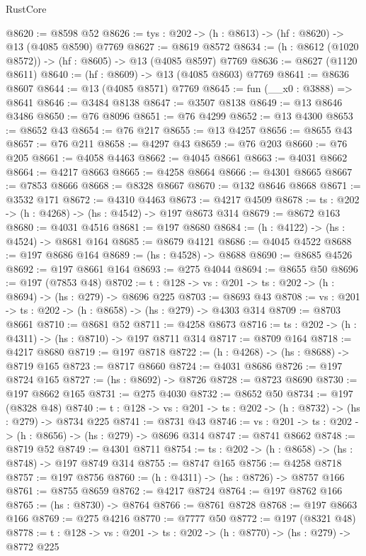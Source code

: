 \begin{lexlean}{RustCore}
\begin{coremodule}
@8620 := @8598 @52
@8626 := {tys : @202} -> (h : @8613) -> (hf : @8620) -> @13 (@4085 @8590) @7769
@8627 := @8619 @8572
@8634 := (h : @8612 (@1020 @8572)) -> (hf : @8605) -> @13 (@4085 @8597) @7769
@8636 := @8627 (@1120 @8611)
@8640 := (hf : @8609) -> @13 (@4085 @8603) @7769
@8641 := @8636 @8607
@8644 := @13 (@4085 @8571) @7769
@8645 := fun (__x0 : @3888) => @8641
@8646 := @3484 @8138
@8647 := @3507 @8138
@8649 := @13 @8646 @3486
@8650 := @76 @8096
@8651 := @76 @4299
@8652 := @13 @4300
@8653 := @8652 @43
@8654 := @76 @217
@8655 := @13 @4257
@8656 := @8655 @43
@8657 := @76 @211
@8658 := @4297 @43
@8659 := @76 @203
@8660 := @76 @205
@8661 := @4058 @4463
@8662 := @4045 @8661
@8663 := @4031 @8662
@8664 := @4217 @8663
@8665 := @4258 @8664
@8666 := @4301 @8665
@8667 := @7853 @8666
@8668 := @8328 @8667
@8670 := @132 @8646 @8668
@8671 := @3532 @171
@8672 := @4310 @4463
@8673 := @4217 @4509
@8678 := {ts : @202} -> (h : @4268) -> (hs : @4542) -> @197 @8673 @314
@8679 := @8672 @163
@8680 := @4031 @4516
@8681 := @197 @8680
@8684 := (h : @4122) -> (hs : @4524) -> @8681 @164
@8685 := @8679 @4121
@8686 := @4045 @4522
@8688 := @197 @8686 @164
@8689 := (hs : @4528) -> @8688
@8690 := @8685 @4526
@8692 := @197 @8661 @164
@8693 := @275 @4044
@8694 := @8655 @50
@8696 := @197 (@7853 @48)
@8702 := {t : @128} -> {vs : @201} -> {ts : @202} -> (h : @8694) -> (hs : @279) -> @8696 @225
@8703 := @8693 @43
@8708 := {vs : @201} -> {ts : @202} -> (h : @8658) -> (hs : @279) -> @4303 @314
@8709 := @8703 @8661
@8710 := @8681 @52
@8711 := @4258 @8673
@8716 := {ts : @202} -> (h : @4311) -> (hs : @8710) -> @197 @8711 @314
@8717 := @8709 @164
@8718 := @4217 @8680
@8719 := @197 @8718
@8722 := (h : @4268) -> (hs : @8688) -> @8719 @165
@8723 := @8717 @8660
@8724 := @4031 @8686
@8726 := @197 @8724 @165
@8727 := (hs : @8692) -> @8726
@8728 := @8723 @8690
@8730 := @197 @8662 @165
@8731 := @275 @4030
@8732 := @8652 @50
@8734 := @197 (@8328 @48)
@8740 := {t : @128} -> {vs : @201} -> {ts : @202} -> (h : @8732) -> (hs : @279) -> @8734 @225
@8741 := @8731 @43
@8746 := {vs : @201} -> {ts : @202} -> (h : @8656) -> (hs : @279) -> @8696 @314
@8747 := @8741 @8662
@8748 := @8719 @52
@8749 := @4301 @8711
@8754 := {ts : @202} -> (h : @8658) -> (hs : @8748) -> @197 @8749 @314
@8755 := @8747 @165
@8756 := @4258 @8718
@8757 := @197 @8756
@8760 := (h : @4311) -> (hs : @8726) -> @8757 @166
@8761 := @8755 @8659
@8762 := @4217 @8724
@8764 := @197 @8762 @166
@8765 := (hs : @8730) -> @8764
@8766 := @8761 @8728
@8768 := @197 @8663 @166
@8769 := @275 @4216
@8770 := @7777 @50
@8772 := @197 (@8321 @48)
@8778 := {t : @128} -> {vs : @201} -> {ts : @202} -> (h : @8770) -> (hs : @279) -> @8772 @225

\end{coremodule}
\end{lexlean}
